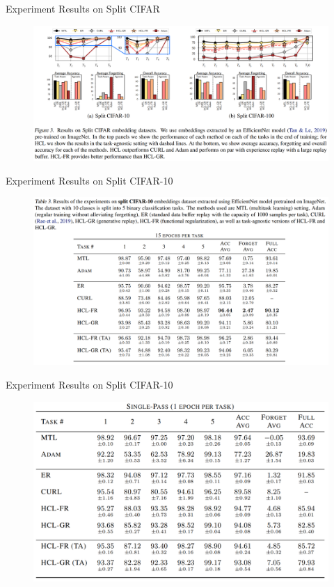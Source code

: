 \documentclass{beamer}
\begin{document}
\begin{frame}{Experiment Results on Split CIFAR}
  \begin{figure}
    \includegraphics[width=1\textwidth]{./figures/Experiment_result_on_CIFAR}
  \end{figure}
\end{frame}

\begin{frame}{Experiment Results on Split CIFAR-10}
  \begin{figure}
    \includegraphics[width=1\textwidth]{./figures/Split_CIFAR10_Results}
  \end{figure}
\end{frame}

\begin{frame}{Experiment Results on Split CIFAR-10}
  \begin{figure}
    \includegraphics[width=1\textwidth]{./figures/Split_CIFAR10_Results_}
  \end{figure}
\end{frame}
\end{document}
